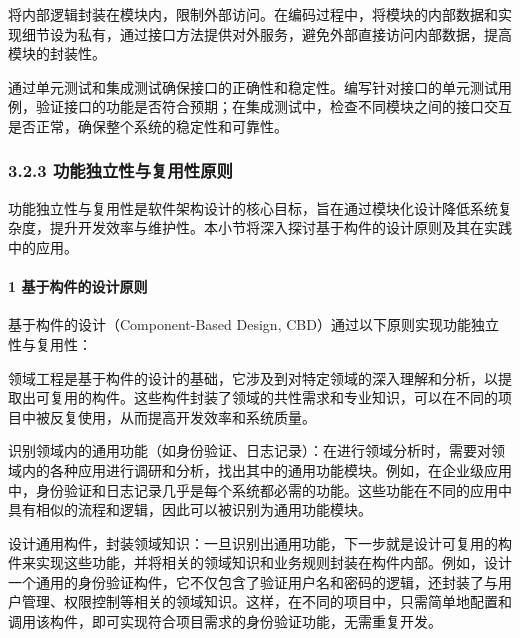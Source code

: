 将内部逻辑封装在模块内，限制外部访问。在编码过程中，将模块的内部数据和实现细节设为私有，通过接口方法提供对外服务，避免外部直接访问内部数据，提高模块的封装性。

通过单元测试和集成测试确保接口的正确性和稳定性。编写针对接口的单元测试用例，验证接口的功能是否符合预期；在集成测试中，检查不同模块之间的接口交互是否正常，确保整个系统的稳定性和可靠性。

\hypertarget{ux529fux80fdux72ecux7acbux6027ux4e0eux590dux7528ux6027ux539fux5219}{%
\subsubsection{3.2.3 功能独立性与复用性原则}\label{ux529fux80fdux72ecux7acbux6027ux4e0eux590dux7528ux6027ux539fux5219}}

功能独立性与复用性是软件架构设计的核心目标，旨在通过模块化设计降低系统复杂度，提升开发效率与维护性。本小节将深入探讨基于构件的设计原则及其在实践中的应用。

\hypertarget{ux57faux4e8eux6784ux4ef6ux7684ux8bbeux8ba1ux539fux5219}{%
\paragraph{1 基于构件的设计原则}\label{ux57faux4e8eux6784ux4ef6ux7684ux8bbeux8ba1ux539fux5219}}

基于构件的设计（Component-Based Design, CBD）通过以下原则实现功能独立性与复用性：


领域工程是基于构件的设计的基础，它涉及到对特定领域的深入理解和分析，以提取出可复用的构件。这些构件封装了领域的共性需求和专业知识，可以在不同的项目中被反复使用，从而提高开发效率和系统质量。


识别领域内的通用功能（如身份验证、日志记录）：在进行领域分析时，需要对领域内的各种应用进行调研和分析，找出其中的通用功能模块。例如，在企业级应用中，身份验证和日志记录几乎是每个系统都必需的功能。这些功能在不同的应用中具有相似的流程和逻辑，因此可以被识别为通用功能模块。

设计通用构件，封装领域知识：一旦识别出通用功能，下一步就是设计可复用的构件来实现这些功能，并将相关的领域知识和业务规则封装在构件内部。例如，设计一个通用的身份验证构件，它不仅包含了验证用户名和密码的逻辑，还封装了与用户管理、权限控制等相关的领域知识。这样，在不同的项目中，只需简单地配置和调用该构件，即可实现符合项目需求的身份验证功能，无需重复开发。

